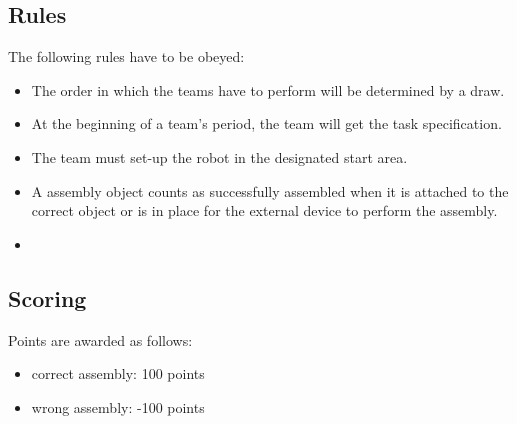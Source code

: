 \subsection{Rules}
The following rules have to be obeyed:

\begin{itemize}
\item The order in which the teams have to perform will be determined by a draw.
\item At the beginning of a team's period, the team will get the task specification. 
\item The team must set-up the robot in the designated start area.
\item A assembly object counts as successfully assembled when it is attached to the correct object or is in place for the external device to perform the assembly.
\item {}
\end{itemize}


\subsection{Scoring}
Points are awarded as follows:

\begin{itemize}
\item correct assembly:  \hfill 100 points
\item wrong assembly:  \hfill -100 points
\end{itemize}


